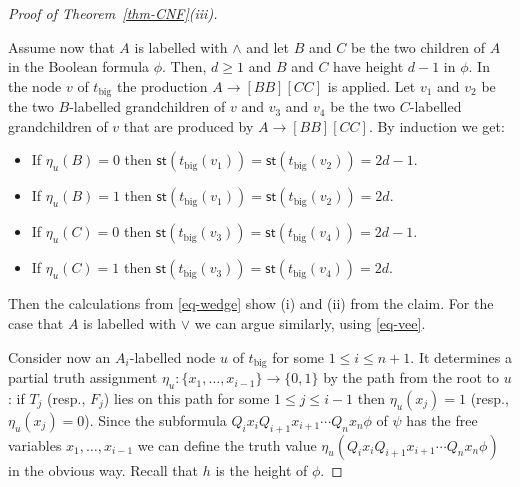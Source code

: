 \documentclass[a4paper,UKenglish,cleveref, autoref, thm-restate, numberwithinsect]{lipics-v2021}
\newcommand{\hs}{\mathsf{st}}
\begin{document}
\begin{proof}[Proof of Theorem~\ref{thm-CNF}(iii)]
\begin{claimproof}
Assume now that $A$ is labelled with $\wedge$ and let $B$ and $C$ be the two children of $A$ in the Boolean formula $\phi$.
Then, $d \geq 1$ and $B$ and $C$ have height $d-1$ in $\phi$. In the node $v$ of $t_{\text{big}}$ the production 
$A \to [BB] [CC]$ is applied. Let $v_1$ and $v_2$ be the two $B$-labelled grandchildren of $v$ and $v_3$ and $v_4$ be the 
two $C$-labelled grandchildren of $v$ that are produced by $A \to [BB] [CC]$. By induction we get: 
\begin{itemize}
\item If $\eta_u(B) = 0$ then $\hs(t_{\text{big}}(v_1)) = \hs(t_{\text{big}}(v_2)) = 2d-1$.
\item If $\eta_u(B) = 1$ then $\hs(t_{\text{big}}(v_1)) = \hs(t_{\text{big}}(v_2)) = 2d$.
\item If $\eta_u(C) = 0$ then $\hs(t_{\text{big}}(v_3)) = \hs(t_{\text{big}}(v_4)) = 2d-1$.
\item If $\eta_u(C) = 1$ then $\hs(t_{\text{big}}(v_3)) = \hs(t_{\text{big}}(v_4)) = 2d$.
\end{itemize} 
Then the calculations from \eqref{eq-wedge} show (i) and (ii) from the claim.
For the case that $A$ is labelled with $\vee$ we can argue similarly, using \eqref{eq-vee}.
\end{claimproof}
Consider now an $A_i$-labelled node $u$ of $t_{\text{big}}$ for some $1 \leq i \leq n+1$. It determines a partial truth assignment
$\eta_u : \{ x_1, \ldots, x_{i-1} \} \to \{0,1\}$ by the path from the root to $u$: if $T_j$ (resp., $F_j$) lies on this path
for some $1 \le j \le i-1$ 
 then $\eta_u(x_j) = 1$ 
(resp., $\eta_u(x_j) = 0$). Since the subformula $Q_i x_i Q_{i+1} x_{i+1} \cdots Q_n x_n \phi$ of $\psi$ has the free variables
$x_1, \ldots, x_{i-1}$ we can define the truth value $\eta_u(Q_i x_i Q_{i+1} x_{i+1} \cdots Q_n x_n \phi)$ in the obvious way.
Recall that $h$ is the height of $\phi$.


\end{proof}
\end{document}
